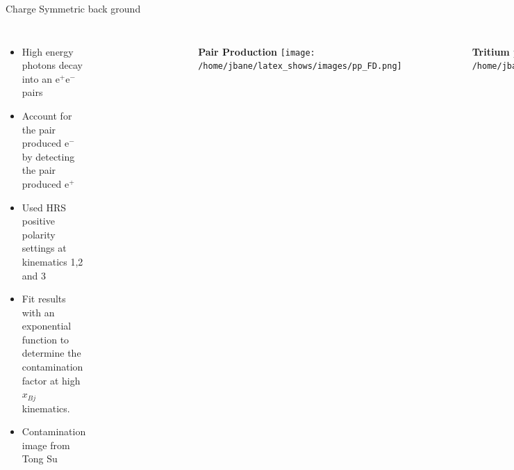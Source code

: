 \documentclass{beamer}
\begin{document}
\begin{frame}{Charge Symmetric back ground}
\vspace{-20pt}
\begin{block}{}
	\begin{columns}
		\begin{itemize}
			\item High energy photons decay into an e$^+$e$^-$ pairs
			\item Account for the pair produced e$^-$ by detecting the pair produced e$^+$
			\item Used HRS positive polarity settings at kinematics 1,2 and 3
			\item Fit results with an exponential function to determine the contamination factor at high $x_{Bj}$ kinematics.
			\item Contamination image from Tong Su
		\end{itemize}
		\begin{figure}
			
		\end{figure}
		\vspace{-40pt}
		\begin{figure}
			\textbf{Pair Production}
			\texttt{[image: /home/jbane/latex\_shows/images/pp\_FD.png]}
		\end{figure}
		\vspace{-20pt}
		\begin{figure}
			\textbf{Tritium positron contamination}
			\texttt{[image: /home/jbane/images/positron\_H3\_bane.pdf]}
		\end{figure}

	\end{columns}
	
\end{block}
\end{frame}
\end{document}
